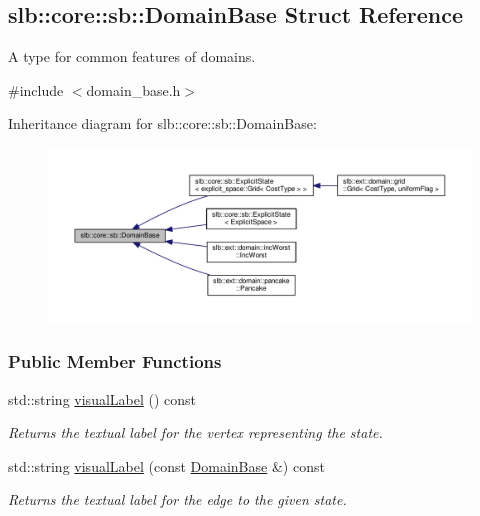 \hypertarget{structslb_1_1core_1_1sb_1_1DomainBase}{}\subsection{slb\+:\+:core\+:\+:sb\+:\+:Domain\+Base Struct Reference}
\label{structslb_1_1core_1_1sb_1_1DomainBase}


A type for common features of domains.  




{\ttfamily \#include $<$domain\+\_\+base.\+h$>$}



Inheritance diagram for slb\+:\+:core\+:\+:sb\+:\+:Domain\+Base\+:\nopagebreak
\begin{figure}[H]
\begin{center}
\leavevmode
\includegraphics[width=350pt]{structslb_1_1core_1_1sb_1_1DomainBase__inherit__graph}
\end{center}
\end{figure}
\subsubsection*{Public Member Functions}
\begin{DoxyCompactItemize}
\item 
std\+::string \hyperlink{structslb_1_1core_1_1sb_1_1DomainBase_a854e1cc1b1eec278542c200e19f48aef}{visual\+Label} () const 
\begin{DoxyCompactList}\small\item\em Returns the textual label for the vertex representing the state. \end{DoxyCompactList}\item 
std\+::string \hyperlink{structslb_1_1core_1_1sb_1_1DomainBase_a6f24f589f9a3874ecb686989250ed6bc}{visual\+Label} (const \hyperlink{structslb_1_1core_1_1sb_1_1DomainBase}{Domain\+Base} \&) const 
\begin{DoxyCompactList}\small\item\em Returns the textual label for the edge to the given state. \end{DoxyCompactList}\end{DoxyCompactItemize}
